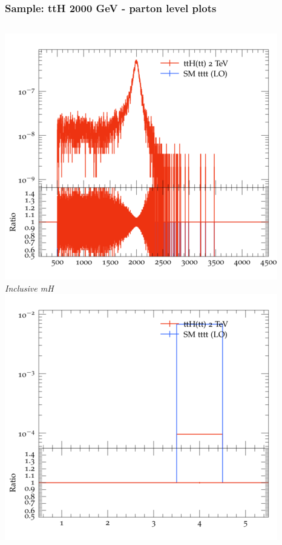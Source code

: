 \documentclass{beamer}
\begin{document}
\begin{frame}
\frametitle{Sample: ttH 2000 GeV - parton level plots}
\begin{columns}
\includegraphics[width=\textwidth]{../plots/ttH_2000/tttt_ttH/Inclusive_mH.png}\\
\textit{\small Inclusive mH}
\includegraphics[width=\textwidth]{../plots/ttH_2000/tttt_ttH/Inclusive_nTop.png}\\

\end{columns}
\end{frame}
\end{document}
